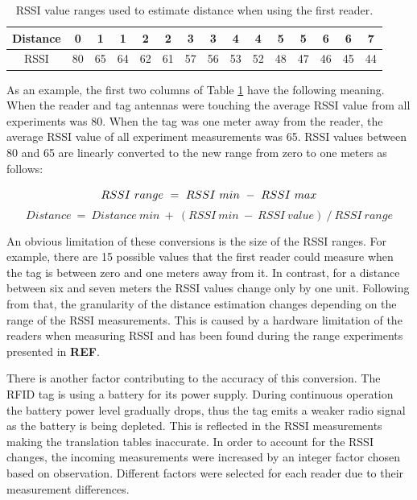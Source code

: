 \begin{table}[h]
	\centering
	\begin{tabular}{ | c | c | c || c | c || c | c || c | c || c | c || c | c || c | c | }
		\hline
		Distance 	& 0  & 1  & 1  & 2  & 2  & 3  & 3  & 4  & 4  & 5  & 5  & 6  & 6  & 7  \\ \hline
		RSSI 		& 80 & 65 & 64 & 62 & 61 & 57 & 56 & 53 & 52 & 48 & 47 & 46 & 45 & 44  \\ \hline
	\end{tabular}
	\caption{RSSI value ranges used to estimate distance when using the first reader.}
	\label{tbl:trans}
\end{table}

As an example, the first two columns of Table \ref{tbl:trans} have the following meaning. When the reader and tag antennas were touching the average RSSI value from all experiments was 80. When the tag was one meter away from the reader, the average RSSI value of all experiment measurements was 65. RSSI values between 80 and 65 are linearly converted to the new range from zero to one meters as follows:

\[RSSI \ range \ = \ RSSI \ min \ - \ RSSI \ max \\\]
\[Distance \ = \ Distance \ min \ + \ (RSSI \ min \ - \ RSSI \ value) \ / \ RSSI \ range\]

An obvious limitation of these conversions is the size of the RSSI ranges. For example, there are 15 possible values that the first reader could measure when the tag is between zero and one meters away from it. In contrast, for a distance between six and seven meters the RSSI values change only by one unit. Following from that, the granularity of the distance estimation changes depending on the range of the RSSI measurements. This is caused by a hardware limitation of the readers when measuring RSSI and has been found during the range experiments presented in \textbf{REF}.

There is another factor contributing to the accuracy of this conversion. The RFID tag is using a battery for its power supply. During continuous operation the battery power level gradually drops, thus the tag emits a weaker radio signal as the battery is being depleted. This is reflected in the RSSI measurements making the translation tables inaccurate. In order to account for the RSSI changes, the incoming measurements were increased by an integer factor chosen based on observation. Different factors were selected for each reader due to their measurement differences.

